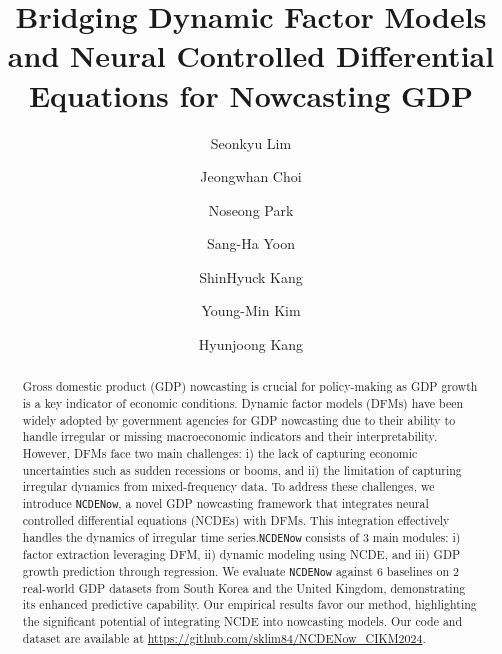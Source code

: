 \documentclass[sigconf]{acmart}
\begin{document}
\title{Bridging Dynamic Factor Models and Neural Controlled Differential Equations for Nowcasting GDP}

\author{Seonkyu Lim}

\author{Jeongwhan Choi}
\authornotemark[1]

\author{Noseong Park}

\author{Sang-Ha Yoon}

\author{ShinHyuck Kang}

\author{Young-Min Kim}
\author{Hyunjoong Kang}

\renewcommand{\shortauthors}{Seonkyu Lim et al.}

\begin{abstract}
Gross domestic product (GDP) nowcasting is crucial for policy-making as GDP growth is a key indicator of economic conditions. Dynamic factor models (DFMs) have been widely adopted by government agencies for GDP nowcasting due to their ability to handle irregular or missing macroeconomic indicators and their interpretability. However, DFMs face two main challenges: i) the lack of capturing economic uncertainties such as sudden recessions or booms, and ii) the limitation of capturing irregular dynamics from mixed-frequency data. To address these challenges, we introduce \texttt{NCDENow}, a novel GDP nowcasting framework that integrates neural controlled differential equations (NCDEs) with DFMs. This integration effectively handles the dynamics of irregular time series.\texttt{NCDENow} consists of 3 main modules: i) factor extraction leveraging DFM, ii) dynamic modeling using NCDE, and iii) GDP growth prediction through regression. 
We evaluate \texttt{NCDENow} against 6 baselines on 2 real-world GDP datasets from South Korea and the United Kingdom, demonstrating its enhanced predictive capability. Our empirical results favor our method, highlighting the significant potential of integrating NCDE into nowcasting models. Our code and dataset are available at \url{https://github.com/sklim84/NCDENow_CIKM2024}.
\end{abstract}
\end{document}
